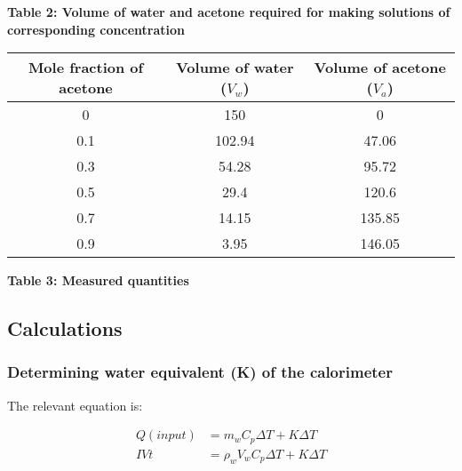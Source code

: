 \documentclass[11pt]{article}
\begin{document}
\textbf{Table 2: Volume of water and acetone required for making
  solutions of corresponding concentration}

\begin{table}[h]
  \centering
  \begin{tabular}{|c|c|c|}
    \hline
    Mole fraction of acetone & Volume of water (\(V_w\)) & Volume of acetone (\(V_a\)) \\
    \hline
    0                        & 150                       & 0                           \\
    \hline
    0.1                      & 102.94                    & 47.06                       \\
    \hline
    0.3                      & 54.28                     & 95.72                       \\
    \hline
    0.5                      & 29.4                      & 120.6                       \\
    \hline
    0.7                      & 14.15                     & 135.85                      \\
    \hline
    0.9                      & 3.95                      & 146.05                      \\
    \hline
  \end{tabular}
\end{table}

\textbf{Table 3: Measured quantities}

\begin{center}
\end{center}

\hypertarget{calculations}{%
  \subsection{Calculations}\label{calculations}}

\hypertarget{determining-water-equivalent-k-of-the-calorimeter}{%
  \subsubsection{Determining water equivalent (K) of the
    calorimeter}\label{determining-water-equivalent-k-of-the-calorimeter}}

The relevant equation is:

\begin{equation}
  \begin{split}
    Q(input) &= m_wC_p\Delta T+K\Delta T\\
    IVt&=\rho_wV_wC_p\Delta T+K\Delta T
  \end{split}
\end{equation}
\end{document}
